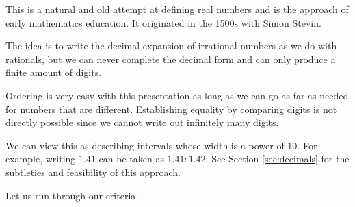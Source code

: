 \documentclass[12pt]{article}
\begin{document}
This is a natural and old attempt at defining real numbers and is the approach of early mathematics education. It originated in the 1500s with Simon Stevin. 

The idea is to write the decimal expansion of irrational numbers as we do with rationals, but we can never complete the decimal form and can only produce a finite amount of digits. 

Ordering is very easy with this presentation as long as we can go as far as needed for numbers that are different. Establishing equality by comparing digits is not directly possible since we cannot write out infinitely many digits. 

We can view this as describing intervals whose width is a power of 10. For example, writing $1.41$ can be taken as $1.41:1.42$. See Section \ref{sec:decimals} for the subtleties and feasibility of this approach. 

Let us run through our criteria. 
\end{document}
